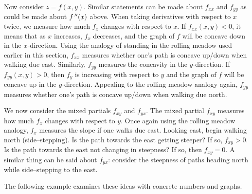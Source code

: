 Now consider $z=f(x,y)$. Similar statements can be made about $f_{xx}$ and $f_{yy}$ as could be made about $f\,''(x)$ above. When taking derivatives with respect to $x$ twice, we measure how much $f_x$ changes with respect to $x$. If $f_{xx}(x,y)<0$, it means that as $x$ increases, $f_x$ decreases, and the graph of $f$ will be concave down in the $x$-direction. Using the analogy of standing in the rolling meadow used earlier in this section, $f_{xx}$ measures whether one's path is concave up/down when walking due east.
Similarly, $f_{yy}$ measures the concavity in the $y$-direction. If $f_{yy}(x,y)>0$, then $f_y$ is increasing with respect to $y$ and the graph of $f$ will be concave up in the $y$-direction. Appealing to the rolling meadow analogy again, $f_{yy}$ measures whether one's path is concave up/down when walking due north.

We now consider the mixed partials $f_{xy}$ and $f_{yx}$. The mixed partial $f_{xy}$ measures how much $f_x$ changes with respect to $y$. Once again using the rolling meadow analogy, $f_{x}$ measures the slope if one walks due east. Looking east, begin walking north (side--stepping). Is the path towards the east getting steeper? If so, $f_{xy}>0$. Is the path towards the east not changing in steepness? If so, then $f_{xy}=0$. A similar thing can be said about $f_{yx}$: consider the steepness of paths heading north while side--stepping to the east.

The following example examines these ideas with concrete numbers and graphs.


